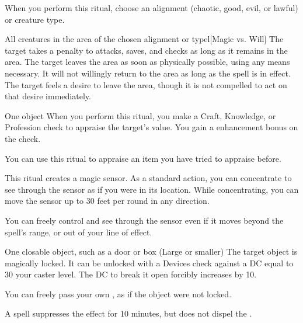 \spellspecial When you perform this ritual, choose an alignment (chaotic, good, evil, or lawful) or creature type.
\begin{spelltargets}{All creatures in the area of the chosen alignment or type}l[Magic vs. Will]
    \spelleffect The target takes a  penalty to attacks, saves, and checks as long as it remains in the area.
    \spellsuccess The target leaves the area as soon as physically possible, using any means necessary. It will not willingly return to the area as long as the spell is in effect.
    \spellfailure The target feels a desire to leave the area, though it is not compelled to act on that desire immediately.
\end{spelltargets}

\spellrng{\rngtouch}
\begin{spelltarget}{One object}
    \spelleffect When you perform this ritual, you make a Craft, Knowledge, or Profession check to appraise the target's value. You gain a  enhancement bonus on the check.
\end{spelltarget}
\spellnotes You can use this ritual to appraise an item you have tried to appraise before.

\spellrng{\rngmed}
\spelldur{\durlong \dismissable}
\spellline
\spelleffect This ritual creates a magic sensor. As a standard action, you can concentrate to see through the sensor as if you were in its location. While concentrating, you can move the sensor up to 30 feet per round in any direction.

You can freely control and see through the sensor even if it moves beyond the spell's range, or out of your line of effect.
\spellnotes {}

\begin{spelltarget}{One closable object, such as a door or box (Large or smaller)}
    \spelleffect The target object is magically locked. It can be unlocked with a Devices check against a DC equal to 30 \add your caster level. The DC to break it open forcibly increases by 10.

    You can freely pass your own , as if the object were not locked.
\end{spelltarget}
\spellnotes A  spell suppresses the effect for 10 minutes, but does not dispel the .

